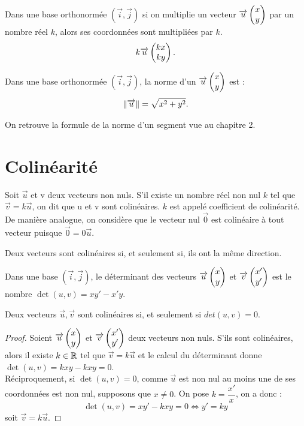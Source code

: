 \documentclass[a4paper, 12pt]{report}
\begin{document}
\begin{prop}
Dans une base orthonormée $(\vec{i}, \vec{j})$ si on multiplie un vecteur $\overrightarrow{u}\begin{pmatrix} x \\ y \end{pmatrix}$
par un nombre réel $k$, alors ses coordonnées sont multipliées par $k$.
\[ k \overrightarrow{u} \begin{pmatrix} kx \\ ky \end{pmatrix} . \] 
\end{prop}

\begin{prop}
Dans une base orthonormée $(\vec{i}, \vec{j})$, la norme d'un $\overrightarrow{u}\begin{pmatrix} x \\ y \end{pmatrix}$ est :
\[ \lVert\overrightarrow{u}\rVert = \sqrt{x^2+y^2} . \]
\end{prop}

\begin{rmq}
On retrouve la formule de la norme d'un segment vue au chapitre 2.
\end{rmq}

\section{Colinéarité}

\begin{defn}[Colinéarité]
Soit $\vec{u}$ et v deux vecteurs non nuls.
S’il existe un nombre réel non nul $k$ tel que $\vec{v} = k \vec{u}$, on dit que u et v sont colinéaires. 
$k$ est appelé coefficient de colinéarité.
De manière analogue, on considère que le vecteur nul $\vec{0}$ est colinéaire à tout vecteur puisque $\vec{0} = 0\vec{u}$.
\end{defn}

\begin{rmq}
Deux vecteurs sont colinéaires si, et seulement si, ils ont la même direction.
\end{rmq}

\begin{defn}
Dans une base $(\vec{i}, \vec{j})$, le déterminant des vecteurs $\overrightarrow{u}  \begin{pmatrix} x \\ y \end{pmatrix}$
et $\overrightarrow{v} \begin{pmatrix} x' \\ y' \end{pmatrix}$ est le nombre $\det(u,v) = xy' - x'y$.
\end{defn}

\begin{prop}
Deux vecteurs $\vec{u}, \vec{v}$ sont colinéaires si, et seulement si $det(u,v) = 0$.
\end{prop}

\begin{proof}
Soient $\overrightarrow{u}  \begin{pmatrix} x \\ y \end{pmatrix}$ et $\overrightarrow{v} \begin{pmatrix} x' \\ y' \end{pmatrix}$ deux vecteurs non nuls. S'ils sont colinéaires, alors il existe $k \in \mathbb{R}$ tel que
$\vec{v} = k \vec{u}$ et le calcul du déterminant donne $\det(u,v) = k xy - k xy = 0$. \\
Réciproquement, si $\det(u,v)=0$, comme $\vec{u}$ est non nul au moins une de ses coordonnées est non nul, 
supposons que $x \neq 0$. On pose $k = \dfrac{x'}{x}$, on a donc :
\[ \det(u,v) = xy' - kxy = 0 \iff y' = ky \]
soit $\vec{v} = k \vec{u}$.
\end{proof}
\end{document}
